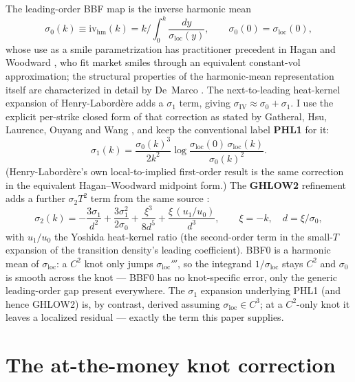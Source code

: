 \documentclass[11pt]{article}
\newcommand{\sloc}{\sigma_{\mathrm{loc}}}
\newcommand{\siv}{\sigma_{\mathrm{IV}}}
\newcommand{\ivhm}{\mathrm{iv}_{\mathrm{hm}}}
\begin{document}
The leading-order BBF map
\citep{berestycki2002} is the inverse harmonic mean
\begin{equation}
\sigma_0(k)\equiv\ivhm(k)=k\Big/\!\int_0^k \frac{dy}{\sloc(y)},
\qquad \sigma_0(0)=\sloc(0),
\end{equation}
whose use as a smile parametrization has practitioner precedent in Hagan
and Woodward \citep{haganWoodward1999}, who fit market smiles through an
equivalent constant-vol approximation; the structural properties of the
harmonic-mean representation itself are characterized in detail by
De~Marco \citep{demarco2021}.
The next-to-leading heat-kernel expansion of Henry-Labord\`ere
\citep{henrylabordere2008} adds a $\sigma_1$ term, giving
$\siv\approx\sigma_0+\sigma_1$. I use the explicit per-strike closed form of
that correction as stated by Gatheral, Hsu, Laurence, Ouyang and Wang
\citep[Thm.~2.4]{gatheral2012}, and keep the conventional label
\textbf{PHL1} for it:
\begin{equation}
\sigma_1(k)=\frac{\sigma_0(k)^3}{2k^2}
  \log\!\frac{\sloc(0)\,\sloc(k)}{\sigma_0(k)^2} .
\label{eq:phl1}
\end{equation}
(Henry-Labord\`ere's own local-to-implied first-order result is the same
correction in the equivalent Hagan--Woodward \citep{haganWoodward1999}
midpoint form.) The \textbf{GHLOW2} refinement adds a further $\sigma_2
T^2$ term from the same source \citep[eq.~3.19, time-homogeneous,
$r=0$]{gatheral2012}:
\begin{equation}
\sigma_2(k)
= -\frac{3\sigma_1}{d^{2}}
  + \frac{3\sigma_1^{2}}{2\sigma_0}
  + \frac{\xi^{3}}{8 d^{5}}
  + \frac{\xi\,(u_1/u_0)}{d^{3}},
\qquad \xi=-k,\quad d=\xi/\sigma_0,
\label{eq:sig2}
\end{equation}
with $u_1/u_0$ the Yoshida heat-kernel ratio (the second-order term in
the small-$T$ expansion of the transition density's leading
coefficient). BBF0 is a harmonic mean of $\sloc$: a $C^2$ knot only
jumps $\sloc'''$, so the integrand $1/\sloc$ stays $C^2$ and $\sigma_0$ is
smooth across the knot --- BBF0 has no knot-specific error, only the generic
leading-order gap present everywhere. The $\sigma_1$ expansion underlying
PHL1 (and hence GHLOW2) is, by contrast, derived assuming $\sloc\in C^3$; at
a $C^2$-only knot it leaves a localized residual --- exactly the term
this paper supplies.

\section{The at-the-money knot correction}
\end{document}
